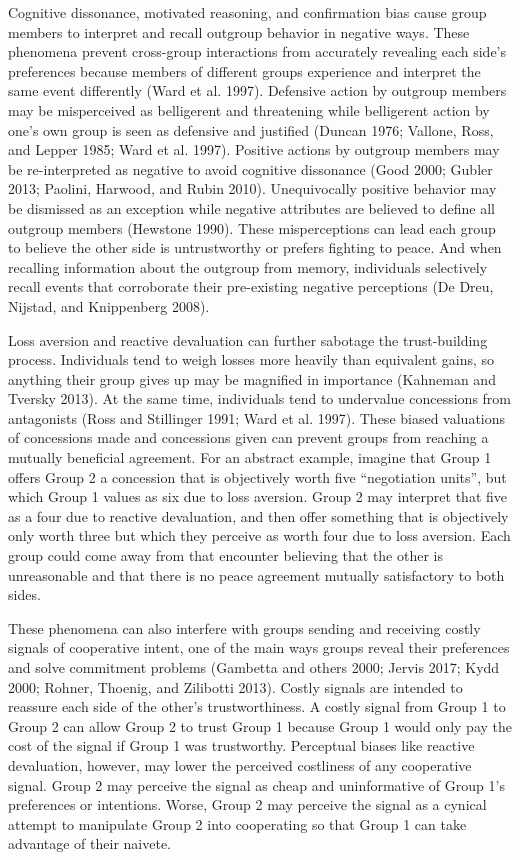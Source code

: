 \documentclass[11pt]{article}
\begin{document}
Cognitive dissonance, motivated reasoning, and confirmation bias cause
group members to interpret and recall outgroup behavior in negative
ways. These phenomena prevent cross-group interactions from accurately
revealing each side's preferences because members of different groups
experience and interpret the same event differently (Ward et al. 1997).
Defensive action by outgroup members may be misperceived as belligerent
and threatening while belligerent action by one's own group is seen as
defensive and justified (Duncan 1976; Vallone, Ross, and Lepper 1985;
Ward et al. 1997). Positive actions by outgroup members may be
re-interpreted as negative to avoid cognitive dissonance (Good 2000;
Gubler 2013; Paolini, Harwood, and Rubin 2010). Unequivocally positive
behavior may be dismissed as an exception while negative attributes are
believed to define all outgroup members (Hewstone 1990). These
misperceptions can lead each group to believe the other side is
untrustworthy or prefers fighting to peace. And when recalling
information about the outgroup from memory, individuals selectively
recall events that corroborate their pre-existing negative perceptions
(De Dreu, Nijstad, and Knippenberg 2008).

Loss aversion and reactive devaluation can further sabotage the
trust-building process. Individuals tend to weigh losses more heavily
than equivalent gains, so anything their group gives up may be magnified
in importance (Kahneman and Tversky 2013). At the same time, individuals
tend to undervalue concessions from antagonists (Ross and Stillinger
1991; Ward et al. 1997). These biased valuations of concessions made and
concessions given can prevent groups from reaching a mutually beneficial
agreement. For an abstract example, imagine that Group 1 offers Group 2
a concession that is objectively worth five ``negotiation units'', but
which Group 1 values as six due to loss aversion. Group 2 may interpret
that five as a four due to reactive devaluation, and then offer
something that is objectively only worth three but which they perceive
as worth four due to loss aversion. Each group could come away from that
encounter believing that the other is unreasonable and that there is no
peace agreement mutually satisfactory to both sides.

These phenomena can also interfere with groups sending and receiving
costly signals of cooperative intent, one of the main ways groups reveal
their preferences and solve commitment problems (Gambetta and others
2000; Jervis 2017; Kydd 2000; Rohner, Thoenig, and Zilibotti 2013).
Costly signals are intended to reassure each side of the other's
trustworthiness. A costly signal from Group 1 to Group 2 can allow Group
2 to trust Group 1 because Group 1 would only pay the cost of the signal
if Group 1 was trustworthy. Perceptual biases like reactive devaluation,
however, may lower the perceived costliness of any cooperative signal.
Group 2 may perceive the signal as cheap and uninformative of Group 1's
preferences or intentions. Worse, Group 2 may perceive the signal as a
cynical attempt to manipulate Group 2 into cooperating so that Group 1
can take advantage of their naivete.
\end{document}
